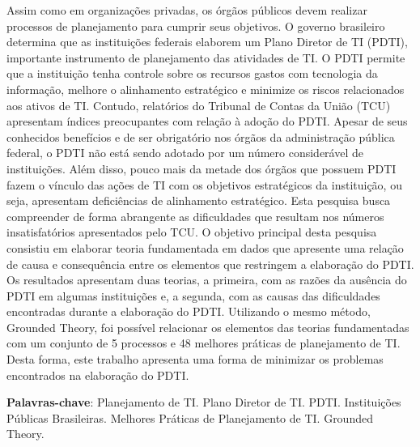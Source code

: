 \documentclass[
	12pt,				%
	openany, %
	oneside, %
	a4paper,			%
	english,			%
	french,				%
	spanish,			%
	brazil				%
	]{abntex2}
\begin{document}
\begin{resumo}
Assim como em organizações privadas, os órgãos públicos devem realizar processos de planejamento para cumprir seus objetivos. O governo brasileiro determina que as instituições federais elaborem um Plano Diretor de TI (PDTI), importante instrumento de planejamento das atividades de TI. O PDTI permite que a instituição tenha controle sobre os recursos gastos com tecnologia da informação, melhore o alinhamento estratégico e minimize os riscos relacionados aos ativos de TI.
Contudo, relatórios do Tribunal de Contas da União (TCU) apresentam índices preocupantes com relação à adoção do PDTI. Apesar de seus conhecidos benefícios e de ser obrigatório nos órgãos da administração pública federal, o PDTI não está sendo adotado por um número considerável de instituições. Além disso, pouco mais da metade dos órgãos que possuem PDTI fazem o vínculo das ações de TI com os objetivos estratégicos da instituição, ou seja, apresentam deficiências de alinhamento estratégico.
Esta pesquisa busca compreender de forma abrangente as dificuldades que resultam nos números insatisfatórios apresentados pelo TCU. O objetivo principal desta pesquisa consistiu em elaborar teoria fundamentada em dados que apresente uma relação de causa e consequência entre os elementos que restringem a elaboração do PDTI. Os resultados apresentam duas teorias, a primeira, com as razões da ausência do PDTI em algumas instituições e, a segunda, com as causas das dificuldades encontradas durante a elaboração do PDTI. Utilizando o mesmo método, Grounded Theory, foi possível relacionar os elementos das teorias fundamentadas com um conjunto de 5 processos e 48 melhores práticas de planejamento de TI. Desta forma, este trabalho apresenta uma forma de minimizar os problemas encontrados na elaboração do PDTI.



 \textbf{Palavras-chave}: Planejamento de TI. Plano Diretor de TI. PDTI. Instituições Públicas Brasileiras. Melhores Práticas de Planejamento de TI. Grounded Theory.
\end{resumo}
\end{document}
